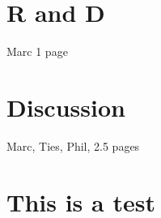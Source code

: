 \documentclass[%
 reprint,
 amsmath,amssymb,
 aps,
]{revtex4-1}
\begin{document}
\section{\label{sec:RandD}R and D}

Marc 1 page

\section{\label{sec:discussion}Discussion}

Marc, Ties, Phil, 2.5 pages


\section{This is a test}
\end{document}
